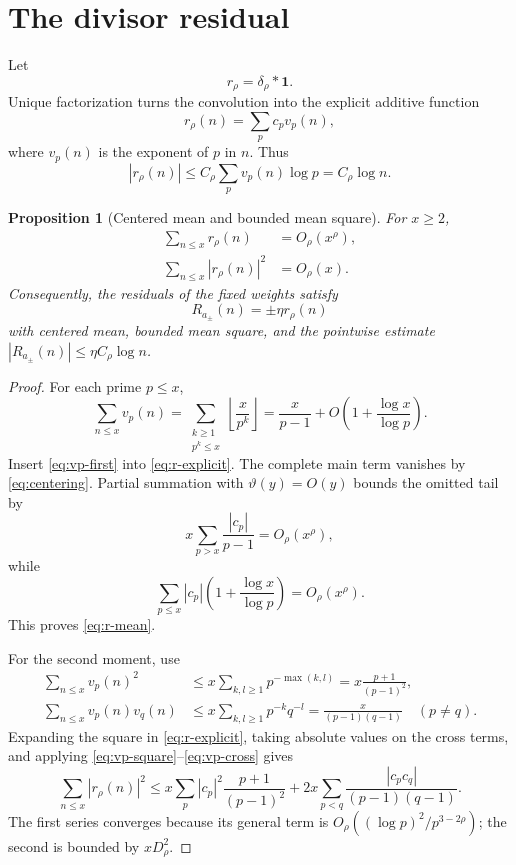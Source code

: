 \documentclass[11pt,a4paper]{amsart}
\newtheorem{proposition}[theorem]{Proposition}
\theoremstyle{definition}
\newcommand{\1}{\mathbf 1}
\begin{document}
\section{The divisor residual}\label{sec:divisor}

Let
\begin{equation}\label{eq:r-def}
 r_\rho=\delta_\rho*\1.
\end{equation}
Unique factorization turns the convolution into the explicit additive function
\begin{equation}\label{eq:r-explicit}
 r_\rho(n)=\sum_p c_pv_p(n),
\end{equation}
where $v_p(n)$ is the exponent of $p$ in $n$.  Thus
\begin{equation}\label{eq:r-pointwise}
 |r_\rho(n)|
 \le C_\rho\sum_pv_p(n)\log p
 =C_\rho\log n.
\end{equation}

\begin{proposition}[Centered mean and bounded mean square]\label{prop:residual-moments}
For $x\ge2$,
\begin{align}
 \sum_{n\le x}r_\rho(n)&=O_\rho(x^\rho),\label{eq:r-mean}\\
 \sum_{n\le x}|r_\rho(n)|^2&=O_\rho(x).\label{eq:r-L2}
\end{align}
Consequently, the residuals of the fixed weights satisfy
\[
 R_{a_\pm}(n)=\pm\eta r_\rho(n)
\]
with centered mean, bounded mean square, and the pointwise estimate
$|R_{a_\pm}(n)|\le\eta C_\rho\log n$.
\end{proposition}

\begin{proof}
For each prime $p\le x$,
\begin{equation}\label{eq:vp-first}
 \sum_{n\le x}v_p(n)
 =\sum_{\substack{k\ge1\\p^k\le x}}\left\lfloor\frac{x}{p^k}\right\rfloor
 =\frac{x}{p-1}+O\!\left(1+\frac{\log x}{\log p}\right).
\end{equation}
Insert \eqref{eq:vp-first} into \eqref{eq:r-explicit}.  The complete main term vanishes by \eqref{eq:centering}.  Partial summation with $\vartheta(y)=O(y)$ bounds the omitted tail by
\[
 x\sum_{p>x}\frac{|c_p|}{p-1}=O_\rho(x^\rho),
\]
while
\[
 \sum_{p\le x}|c_p|\left(1+\frac{\log x}{\log p}\right)
 =O_\rho(x^\rho).
\]
This proves \eqref{eq:r-mean}.

For the second moment, use
\begin{align}
 \sum_{n\le x}v_p(n)^2
 &\le x\sum_{k,l\ge1}p^{-\max(k,l)}
 =x\frac{p+1}{(p-1)^2},\label{eq:vp-square}\\
 \sum_{n\le x}v_p(n)v_q(n)
 &\le x\sum_{k,l\ge1}p^{-k}q^{-l}
 =\frac{x}{(p-1)(q-1)}\quad(p\ne q).\label{eq:vp-cross}
\end{align}
Expanding the square in \eqref{eq:r-explicit}, taking absolute values on the cross terms, and applying \eqref{eq:vp-square}--\eqref{eq:vp-cross} gives
\[
 \sum_{n\le x}|r_\rho(n)|^2
 \le x\sum_p|c_p|^2\frac{p+1}{(p-1)^2}
 +2x\sum_{p<q}\frac{|c_pc_q|}{(p-1)(q-1)}.
\]
The first series converges because its general term is
$O_\rho((\log p)^2/p^{3-2\rho})$; the second is bounded by $xD_\rho^2$.
\end{proof}
\end{document}
